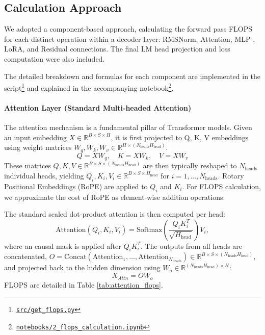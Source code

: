 \documentclass{article}
\begin{document}
\subsection{Calculation Approach}

We adopted a component-based approach, calculating the forward pass FLOPS for each distinct operation within a decoder layer: RMSNorm, Attention, MLP , LoRA, and Residual connections. The final LM head projection and loss computation were also included.

The detailed breakdown and formulas for each component are implemented in the script\footnote{\href{https://gitlab.developers.cam.ac.uk/phy/data-intensive-science-mphil/assessments/m2_coursework/ym429/-/blob/main/src/get_flops.py?ref_type=heads}{\texttt{src/get\_flops.py}}} and explained in the accompanying notebook\footnote{\href{https://gitlab.developers.cam.ac.uk/phy/data-intensive-science-mphil/assessments/m2_coursework/ym429/-/blob/main/notebooks/2_flops_calculation.ipynb?ref_type=heads}{\texttt{notebooks/2\_flops\_calculation.ipynb}}}.




\paragraph{Attention Layer (Standard Multi-headed Attention)}
The attention mechanism is a fundamental pillar of Transformer models. Given an input embedding $X \in \mathbb{R}^{B \times S \times H}$, it is first projected to Q, K, V embeddings using weight matrices $W_q, W_k, W_v \in \mathbb{R}^{H \times (N_{\text{heads}}H_{\text{head}})}$. 
\begin{equation}
    Q = X W_q, \quad K = X W_k, \quad V = X W_v 
\end{equation}
These matrices $Q, K, V \in \mathbb{R}^{B \times S \times (N_{\text{heads}}H_{\text{head}})}$ are then typically reshaped to $N_{\text{heads}}$ individual heads, yielding $Q_i, K_i, V_i \in \mathbb{R}^{B \times S \times H_{\text{head}}}$ for $i=1, ..., N_{\text{heads}}$. Rotary Positional Embeddings (RoPE) \cite{su2023roformerenhancedtransformerrotary} are applied to $Q_i$ and $K_i$. For FLOPS calculation, we approximate the cost of RoPE as element-wise addition operations.

The standard scaled dot-product attention is then computed per head:
\begin{equation}
    \text{Attention}(Q_i, K_i, V_i) = \text{Softmax}\left(\frac{Q_i K_i^T}{\sqrt{H_{\text{head}}}}\right) V_i, 
\end{equation}
where an causal mask is applied after $Q_i K_i^T$.
The outputs from all heads are concatenated, $O = \text{Concat}(\text{Attention}_1, ..., \text{Attention}_{N_{\text{heads}}}) \in \mathbb{R}^{B \times S \times (N_{\text{heads}}H_{\text{head}})}$, and projected back to the hidden dimension using $W_o \in \mathbb{R}^{(N_{\text{heads}}H_{\text{head}}) \times H}$:
\begin{equation}
    X_{Attn} = O W_o
\end{equation}
FLOPS are detailed in Table \ref{tab:attention_flops}.
\end{document}

